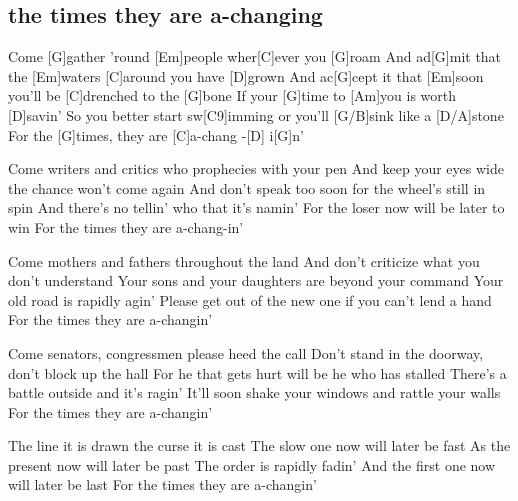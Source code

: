 \subsection*{the times they are a-changing   }
\begin{guitar}
Come [G]gather 'round [Em]people wher[C]ever you [G]roam
And ad[G]mit that the [Em]waters [C]around you have [D]grown
And ac[G]cept it that [Em]soon you'll be [C]drenched to the [G]bone
If your [G]time to [Am]you is worth [D]savin'
So you better start sw[C9]imming or you'll [G/B]sink like a [D/A]stone
For the [G]times, they are [C]a-chang -[D] i[G]n'



Come writers and critics who prophecies with your pen
And keep your eyes wide the chance won't come again
And don't speak too soon for the wheel's still in spin
And there's no tellin' who that it's namin'
For the loser now will be later to win
For the times they are a-chang-in'



Come mothers and fathers throughout the land
And don't criticize what you don't understand
Your sons and your daughters are beyond your command
Your old road is rapidly agin'
Please get out of the new one if you can't lend a hand
For the times they are a-changin'



Come senators, congressmen please heed the call
Don't stand in the doorway, don't block up the hall
For he that gets hurt will be he who has stalled
There's a battle outside and it's ragin'
It'll soon shake your windows and rattle your walls
For the times they are a-changin'



The line it is drawn the curse it is cast
The slow one now will later be fast
As the present now will later be past
The order is rapidly fadin'
And the first one now will later be last
For the times they are a-changin'
\end{guitar}
